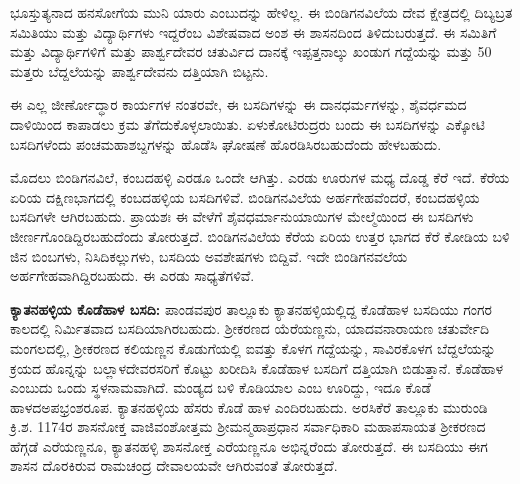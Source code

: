 ಭೂಸ್ತುತ್ಯನಾದ ಹನಸೋಗೆಯ ಮುನಿ ಯಾರು ಎಂಬುದನ್ನು ಹೇಳಿಲ್ಲ. ಈ ಬಿಂಡಿಗನವಿಲೆಯ ದೇವ ಕ್ಷೇತ್ರದಲ್ಲಿ ದಿಬ್ಯಬ್ರತ ಸಮಿತಿಯು ಮತ್ತು ವಿದ್ಯಾರ್ಥಿಗಳು ಇದ್ದರೆಂಬ ವಿಶೇಷವಾದ ಅಂಶ ಈ ಶಾಸನದಿಂದ ತಿಳಿದುಬರುತ್ತದೆ. ಈ ಸಮಿತಿಗೆ ಮತ್ತು ವಿದ್ಯಾರ್ಥಿಗಳಿಗೆ ಮತ್ತು ಪಾರ್ಶ್ವದೇವರ ಚತುರ್ವಿದ ದಾನಕ್ಕೆ ಇಪ್ಪತ್ತನಾಲ್ಕು ಖಂಡುಗ ಗದ್ದೆಯನ್ನು ಮತ್ತು 50 ಮತ್ತರು ಬೆದ್ದಲೆಯನ್ನು ಪಾರ್ಶ್ವದೇವನು ದತ್ತಿಯಾಗಿ ಬಿಟ್ಟನು.

ಈ ಎಲ್ಲ ಜೀರ್ಣೋದ್ಧಾರ ಕಾರ್ಯಗಳ ನಂತರವೇ, ಈ ಬಸದಿಗಳನ್ನು ಈ ದಾನಧರ್ಮಗಳನ್ನು, ಶೈವರ್ಧಮದ ದಾಳಿಯಿಂದ ಕಾಪಾಡಲು ಕ್ರಮ ತೆಗೆದುಕೊಳ್ಳಲಾಯಿತು. ಏಳುಕೋಟಿರುದ್ರರು ಬಂದು ಈ ಬಸದಿಗಳನ್ನು ಎಕ್ಕೋಟಿ ಬಸದಿಗಳೆಂದು ಪಂಚಮಹಾಶಬ್ದಗಳನ್ನು ಹೊಡೆಸಿ ಘೋಷಣೆ ಹೊರಡಿಸಿರಬಹುದೆಂದು ಹೇಳಬಹುದು.

ಮೊದಲು ಬಿಂಡಿಗನವಿಲೆ, ಕಂಬದಹಳ್ಳಿ ಎರಡೂ ಒಂದೇ ಆಗಿತ್ತು. ಎರಡು ಊರುಗಳ ಮಧ್ಯ ದೊಡ್ಡ ಕೆರೆ ಇದೆ. ಕೆರೆಯ ಏರಿಯ ದಕ್ಷಿಣಭಾಗದಲ್ಲಿ ಕಂಬದಹಳ್ಳಿಯ ಬಸದಿಗಳಿವೆ. ಬಿಂಡಿಗನವಿಲೆಯ ಅರ್ಹಗೇಹವೆಂದರೆ, ಕಂಬದಹಳ್ಳಿಯ ಬಸದಿಗಳೇ ಆಗಿರಬಹುದು. ಪ್ರಾಯಶಃ ಈ ವೇಳೆಗೆ ಶೈವಧರ್ಮಾನುಯಾಯಿಗಳ ಮೇಲ್ಮೆಯಿಂದ ಈ ಬಸದಿಗಳು ಜೀರ್ಣಗೊಂಡಿದ್ದಿರಬಹುದೆಂದು ತೋರುತ್ತದೆ. ಬಿಂಡಿಗನವಿಲೆಯ ಕೆರೆಯ ಏರಿಯ ಉತ್ತರ ಭಾಗದ ಕೆರೆ ಕೋಡಿಯ ಬಳಿ ಜಿನ ಬಿಂಬಗಳು, ನಿಸಿದಿಕಲ್ಲುಗಳು, ಬಸದಿಯ ಅವಶೇಷಗಳು ಬಿದ್ದಿವೆ. ಇದೇ ಬಿಂಡಿಗನವಲೆಯ ಅರ್ಹಗೇಹವಾಗಿದ್ದಿರ\-ಬಹುದು. ಈ ಎರಡು ಸಾಧ್ಯತೆಗಳಿವೆ.

\textbf{ಕ್ಯಾತನಹಳ್ಳಿಯ ಕೊಡೆಹಾಳ ಬಸದಿ:} ಪಾಂಡವಪುರ ತಾಲ್ಲೂಕು ಕ್ಯಾತನಹಳ್ಳಿಯಲ್ಲಿದ್ದ ಕೊಡೆಹಾಳ ಬಸದಿಯು ಗಂಗರ ಕಾಲದಲ್ಲಿ ನಿರ್ಮಿತವಾದ ಬಸದಿಯಾಗಿರಬಹುದು. ಶ‍್ರೀಕರಣದ ಯೆರೆಯಣ್ಣನು, ಯಾದವನಾರಾಯಣ ಚತುರ್ವೇದಿ ಮಂಗಲದಲ್ಲಿ, ಶ‍್ರೀಕರಣದ ಕಲಿಯಣ್ಣನ ಕೊಡುಗೆಯಲ್ಲಿ ಐವತ್ತು ಕೊಳಗ ಗದ್ದೆಯನ್ನು, ಸಾವಿರಕೊಳಗ ಬೆದ್ದಲೆಯನ್ನು ಕ್ರಯದ ಹೊನ್ನನ್ನು ಬಲ್ಲಾಳದೇವರಸ\-ರಿಗೆ ಕೊಟ್ಟು ಖರೀದಿಸಿ ಕೊಡೆಹಾಳ ಬಸದಿಗೆ ದತ್ತಿಯಾಗಿ ಬಿಡುತ್ತಾನೆ. ಕೊಡೆಹಾಳ ಎಂಬುದು ಒಂದು ಸ್ಥಳನಾಮವಾಗಿದೆ. ಮಂಡ್ಯದ ಬಳಿ ಕೊಡಿಯಾಲ ಎಂಬ ಊರಿದ್ದು, ಇದೂ ಕೊಡೆ ಹಾಳದ\break ಅಪಭ್ರಂಶರೂಪ. ಕ್ಯಾತನಹಳ್ಳಿಯ ಹೆಸರು ಕೊಡೆ ಹಾಳ ಎಂದಿರಬಹುದು. ಅರಸಿಕೆರೆ ತಾಲ್ಲೂಕು ಮುರುಂಡಿ ಕ್ರಿ.ಶ. 1174ರ ಶಾಸನೋಕ್ತ ವಾಜಿವಂಶೋತ್ತಮ ಶ‍್ರೀಮನ್ಮಹಾಪ್ರಧಾನ ಸರ್ವಾಧಿಕಾರಿ ಮಹಾಪಸಾಯತ ಶ‍್ರೀಕರಣದ ಹೆಗ್ಗಡೆ ಎರೆಯಣ್ಣನೂ, ಕ್ಯಾತನಹಳ್ಳಿ ಶಾಸನೋಕ್ತ ಎರೆಯಣ್ಣನೂ ಅಭಿನ್ನರೆಂದು ತೋರುತ್ತದೆ. ಈ ಬಸದಿಯು ಈಗ ಶಾಸನ ದೊರಕಿರುವ ರಾಮಚಂದ್ರ ದೇವಾಲಯವೇ ಆಗಿರುವಂತೆ ತೋರುತ್ತದೆ.

